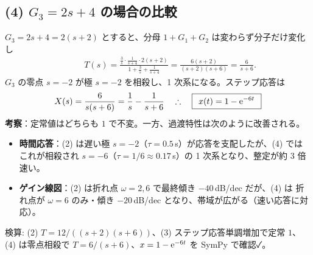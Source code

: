 \documentclass[11pt,a4paper]{article}
\begin{document}
\subsection*{(4) $G_3=2s+4$ の場合の比較}
$G_3=2s+4=2(s+2)$ とすると、分母 $1+G_1+G_2$ は変わらず分子だけ変化し
\begin{align*}
  &\qquad T(s)=\frac{\frac3s\cdot\frac{1}{s+4}\cdot2(s+2)}{1+\frac3s+\frac{1}{s+4}}
   =\frac{6(s+2)}{(s+2)(s+6)}=\frac{6}{s+6}.
\end{align*}
$G_3$ の零点 $s=-2$ が極 $s=-2$ を相殺し、1 次系になる。ステップ応答は
\[
  X(s)=\frac{6}{s(s+6)}=\frac1s-\frac{1}{s+6}
  \quad\therefore\quad \boxed{\,\;x(t)=1-\mathrm{e}^{-6t}\;\,}
\]
\textbf{考察}：定常値はどちらも $1$ で不変。一方、過渡特性は次のように改善される。
\begin{itemize}\setlength{\itemsep}{1pt}
  \item \textbf{時間応答}：(2) は遅い極 $s=-2$（$\tau=0.5\,$s）が応答を支配したが、(4) では
        これが相殺され $s=-6$（$\tau=1/6\approx0.17\,$s）の 1 次系となり、整定が約 3 倍速い。
  \item \textbf{ゲイン線図}：(2) は折れ点 $\omega=2,6$ で最終傾き $-40\,$dB/dec だが、(4) は
        折れ点が $\omega=6$ のみ・傾き $-20\,$dB/dec となり、帯域が広がる（速い応答に対応）。
\end{itemize}

\bigskip
\noindent 検算: (2) $T=12/((s+2)(s+6))$、(3) ステップ応答単調増加で定常 $1$、
(4) は零点相殺で $T=6/(s+6)$、$x=1-\mathrm{e}^{-6t}$ を SymPy で確認✓。
\end{document}

